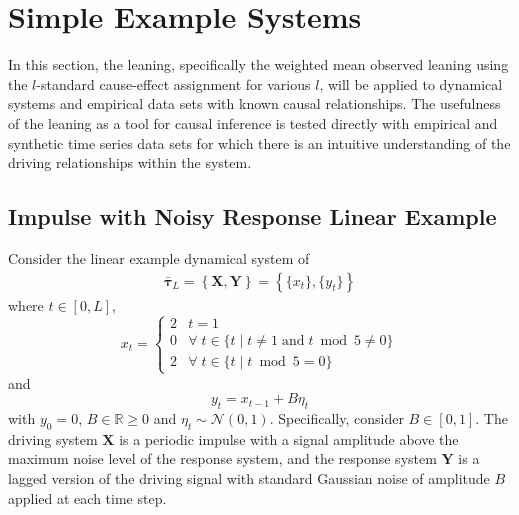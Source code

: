 \documentclass[a4paper,11pt,twocolumn]{article}
\begin{document}
\section{Simple Example Systems}
In this section, the leaning, specifically the weighted mean observed leaning using the $l$-standard cause-effect assignment for various $l$, will be applied to dynamical systems and empirical data sets with known causal relationships.  The usefulness of the leaning as a tool for causal inference is tested directly with empirical and synthetic time series data sets for which there is an intuitive understanding of the driving relationships within the system.

\subsection{Impulse with Noisy Response Linear Example}
Consider the linear example dynamical system of
\begin{eqnarray}
\label{eqn:IReqn}
\bar{\mathbf{\tau}}_L = \left\{\mathbf{X},\mathbf{Y}\right\} = \left\{\{x_t\},\{y_t\}\right\}
\end{eqnarray}
where $t\in[0,L]$,
\begin{equation*}
x_t = \left\{
  \begin{array}{lr}
    2 & t = 1\\
    0 & \forall\; t\in\{t\;|\;t\neq 1 \;\mathrm{and}\; t\bmod 5 \neq 0\}\\
    2 & \forall\; t\in\{t\;|\;t\bmod 5 = 0\}
  \end{array}
\right.
\end{equation*}
and
\begin{equation*}
y_t = x_{t-1} + B\eta_t
\end{equation*}
with $y_0 = 0$, $B\in\mathbb{R}\ge 0$ and $\eta_t\sim\mathcal{N}\left(0,1\right)$.  Specifically, consider $B\in[0,1]$.  The driving system $\mathbf{X}$ is a periodic impulse with a signal amplitude above the maximum noise level of the response system, and the response system $\mathbf{Y}$ is a lagged version of the driving signal with standard Gaussian noise of amplitude $B$ applied at each time step.  
\end{document}
